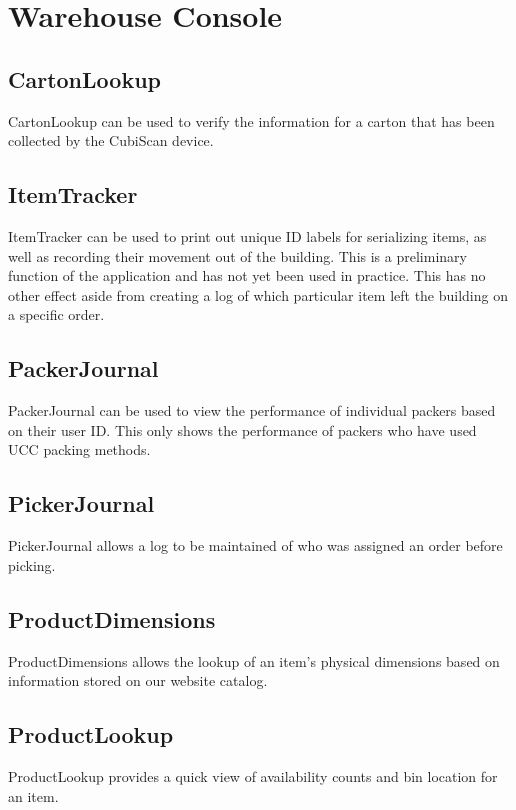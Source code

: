 \section{Warehouse Console}

\subsection{CartonLookup}

CartonLookup can be used to verify the information for a carton that has been collected by the CubiScan device.

\subsection{ItemTracker}

ItemTracker can be used to print out unique ID labels for serializing items, as well as recording their movement out of the building.  This is a preliminary function of the application and has not yet been used in practice. This has no other effect aside from creating a log of which particular item left the building on a specific order.

\subsection{PackerJournal}

PackerJournal can be used to view the performance of individual packers based on their user ID.  This only shows the performance of packers who have used UCC packing methods.

\subsection{PickerJournal}

PickerJournal allows a log to be maintained of who was assigned an order before picking.

\subsection{ProductDimensions}

ProductDimensions allows the lookup of an item's physical dimensions based on information stored on our website catalog.

\subsection{ProductLookup}

ProductLookup provides a quick view of availability counts and bin location for an item.